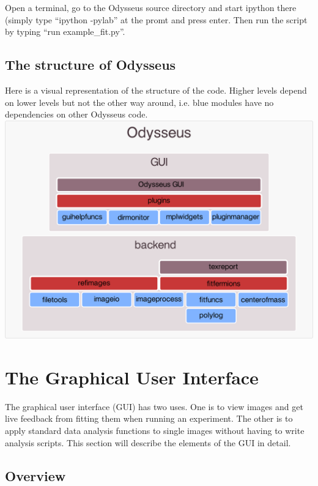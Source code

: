 \documentclass[letterpaper,10pt,english]{manual}
\begin{document}
Open a terminal, go to the Odysseus source directory and start ipython there (simply type ``ipython -pylab'' at the promt and press enter. Then run the script by typing ``run example\_fit.py''.


\subsection{The structure of Odysseus}

Here is a visual representation of the structure of the code. Higher levels depend on lower levels but not the other way around, i.e. blue modules have no dependencies on other Odysseus code.
\includegraphics[width=500pt]{dependency_graph.png}
\resetcurrentobjects
\hypertarget{--doc-gui}{}

\hypertarget{section-gui}{}\section{The Graphical User Interface}

The graphical user interface (GUI) has two uses. One is to view images and get live feedback from fitting them when running an experiment. The other is to apply standard data analysis functions to single images without having to write analysis scripts. This section will describe the elements of the GUI in detail.


\subsection{Overview}
\end{document}
